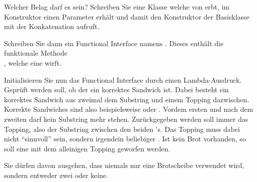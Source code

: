 \documentclass{../tuda-exercise}
\begin{document}
  \begin{task}[credit=\stars{3}{3}]{Welcher Belag darf es sein?}
    Schreiben Sie eine Klasse  welche von 
    erbt, im Konstruktor einen Parameter   erhält und
    damit den Konstruktor der Basisklasse mit der Konkatenation
    \code{\textcolor{stringcolor}{"'There is no bread, only"'} +}  aufruft.

    \br

    Schreiben Sie dann ein Functional Interface namens . Dieses enthält die
    funktionale Methode 
    \\
    , welche eine  wirft.

    \br

    Initialisieren Sie nun das Functional Interface  durch einen
    Lambda-Ausdruck. Geprüft werden soll, ob der  ein korrektes Sandwich ist.
    Dabei besteht ein korrektes Sandwich aus zweimal dem Substring
    \code{\textcolor{stringcolor}{"'bread}} und einem Topping dazwischen. Korrekte Sandwiches
    sind also beispielsweise \code{\textcolor{stringcolor}{"'breadtunabread"'}} oder
    \code{\textcolor{stringcolor}{"'breadabcdefgbread"'}}. Vordem ersten
    \code{\textcolor{stringcolor}{"'bread"'}} und nach dem zweiten
    \code{\textcolor{stringcolor}{"'bread"'}} darf kein Substring mehr stehen. Zurückgegeben
    werden soll immer das Topping, also der Substring zwischen den beiden
    \code{\textcolor{stringcolor}{"'bread"'}}'s. Das Topping muss dabei nicht \enquote{sinnvoll}
    sein, sondern irgendein beliebiger . Ist kein Brot vorhanden, so soll eine
     mit dem alleinigen Topping geworfen werden.

    \br

    Sie dürfen davon ausgehen, dass niemals nur eine Brotscheibe verwendet wird, sondern entweder
    zwei oder keine.

    \clearpagesolution

    \begin{solution}
      
      
    \end{solution}
  \end{task}

  \clearpage
\end{document}
